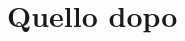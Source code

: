 \documentclass[fleqn,10pt]{SelfArx} %
\begin{document}
	
	\section{Quello dopo}
	
	
	
	
	
\end{document}
